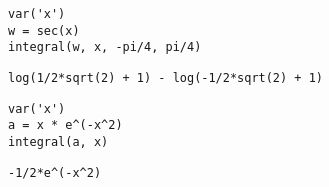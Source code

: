 \documentclass[
]{article}
\begin{document}
\begin{verbatim}
var('x')
w = sec(x)
integral(w, x, -pi/4, pi/4)
\end{verbatim}

\begin{verbatim}
log(1/2*sqrt(2) + 1) - log(-1/2*sqrt(2) + 1)
\end{verbatim}

\begin{verbatim}
var('x')
a = x * e^(-x^2)
integral(a, x)
\end{verbatim}

\begin{verbatim}
-1/2*e^(-x^2)
\end{verbatim}

\begin{verbatim}
\end{verbatim}
\end{document}
